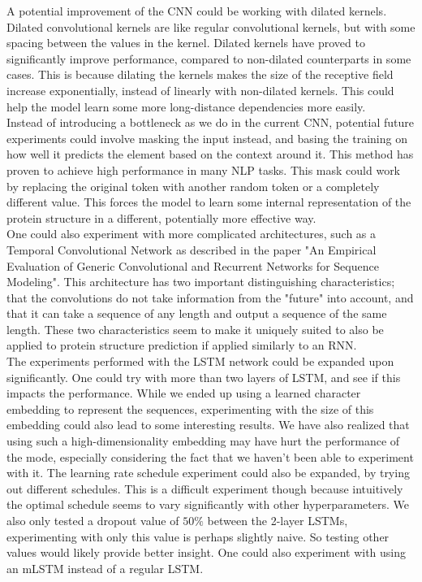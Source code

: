 A potential improvement of the CNN could be working with dilated kernels. Dilated convolutional kernels are like regular convolutional kernels, but with some spacing between the values in the kernel. Dilated kernels have proved to significantly improve performance, compared to non-dilated counterparts in some cases.\cite{cp} This is because dilating the kernels makes the size of the receptive field increase exponentially, instead of linearly with non-dilated kernels. This could help the model learn some more long-distance dependencies more easily.\\

\noindent
Instead of introducing a bottleneck as we do in the current CNN, potential future experiments could involve masking the input instead, and basing the training on how well it predicts the element based on the context around it. This method has proven to achieve high performance in many NLP tasks\cite{BERT}. This mask could work by replacing the original token with another random token or a completely different value. This forces the model to learn some internal representation of the protein structure in a different, potentially more effective way.\\

\noindent
One could also experiment with more complicated architectures, such as a Temporal Convolutional Network as described in the paper "An Empirical Evaluation of Generic Convolutional and Recurrent Networks
for Sequence Modeling".\cite{tcnn} This architecture has two important distinguishing characteristics; that the convolutions do not take information from the "future" into account, and that it can take a sequence of any length and output a sequence of the same length. These two characteristics seem to make it uniquely suited to also be applied to protein structure prediction if applied similarly to an RNN.\\

\noindent
The experiments performed with the LSTM network could be expanded upon significantly. One could try with more than two layers of LSTM, and see if this impacts the performance.  While we ended up using a learned character embedding to represent the sequences, experimenting with the size of this embedding could also lead to some interesting results. We have also realized that using such a high-dimensionality embedding may have hurt the performance of the mode, especially considering the fact that we haven't been able to experiment with it. The learning rate schedule experiment could also be expanded, by trying out different schedules. This is a difficult experiment though because intuitively the optimal schedule seems to vary significantly with other hyperparameters. We also only tested a dropout value of $50\%$ between the 2-layer LSTMs, experimenting with only this value is perhaps slightly naive. So testing other values would likely provide better insight. One could also experiment with using an mLSTM instead of a regular LSTM. \\

